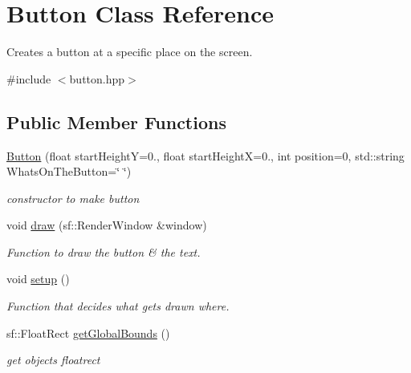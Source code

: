 \hypertarget{class_button}{}\section{Button Class Reference}
\label{class_button}


Creates a button at a specific place on the screen.  




{\ttfamily \#include $<$button.\+hpp$>$}

\subsection*{Public Member Functions}
\begin{DoxyCompactItemize}
\item 
\hyperlink{class_button_a1085aea4e01df12c1400d2f2f666dda2}{Button} (float start\+HeightY=0., float start\+HeightX=0., int position=0, std\+::string Whats\+On\+The\+Button=\char`\"{} \char`\"{})
\begin{DoxyCompactList}\small\item\em constructor to make button \end{DoxyCompactList}\item 
void \hyperlink{class_button_adf65892636ea303a84e1391106ea7cb0}{draw} (sf\+::\+Render\+Window \&window)
\begin{DoxyCompactList}\small\item\em Function to draw the button \& the text. \end{DoxyCompactList}\item 
void \hyperlink{class_button_aaf14334dd0ac6a9c286aac71a765caa2}{setup} ()
\begin{DoxyCompactList}\small\item\em Function that decides what gets drawn where. \end{DoxyCompactList}\item 
sf\+::\+Float\+Rect \hyperlink{class_button_af662f717b2230477da7d4760293473d4}{get\+Global\+Bounds} ()
\begin{DoxyCompactList}\small\item\em get objects floatrect \end{DoxyCompactList}\end{DoxyCompactItemize}
